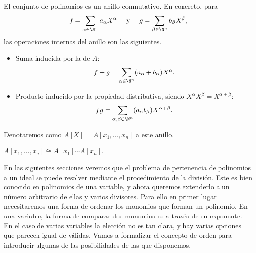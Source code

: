 \begin{proposicion}\label{op:monomios}
    El conjunto de polinomios es un anillo conmutativo. En concreto, para
     $$ f = \sum_{\alpha\in \N^n} a_{\alpha} X^{\alpha}\quad \text{ y }\quad g = \sum_{\beta\in \N^n} b_{\beta} X^{\beta},$$ 
     las operaciones internas del anillo son las siguientes.
    \begin{itemize}
        \item Suma inducida por la de $A$: 
        $$f+g = \sum_{\alpha\in \N^n}(a_{\alpha} + b_{\alpha})X^{\alpha}.$$
        \item Producto inducido por la propiedad distributiva, siendo $X^{\alpha}X^{\beta} = X^{\alpha+\beta}$: 
        $$fg = \sum_{\alpha,\beta \in \N^n} (a_{\alpha}b_{\beta})X^{\alpha+\beta}.$$
    \end{itemize}
    Denotaremos como  $A[X] = A[x_1,\dots, x_n]$ a este anillo.
\end{proposicion}
\begin{proposicion}
    $A[x_1,\dots, x_n] \cong A[x_1]\cdots A[x_n]$.
\end{proposicion}

En las siguientes secciones veremos que el problema de pertenencia de polinomios a un ideal se puede resolver mediante el procedimiento de la división. Este es bien conocido en polinomios de una variable, y ahora queremos extenderlo a un número arbitrario de ellas y varios divisores. Para ello en primer lugar necesitaremos una forma de ordenar los monomios que forman un polinomio. En una variable, la forma  de comparar dos monomios es a través de su exponente. En el caso de varias variables la elección no es tan clara, y hay varias opciones que parecen igual de válidas. Vamos a formalizar el concepto de orden para introducir algunas de las posibilidades de las que disponemos. 

